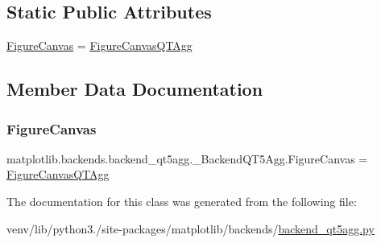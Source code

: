 \subsection*{Static Public Attributes}
\begin{DoxyCompactItemize}
\item 
\hyperlink{classmatplotlib_1_1backends_1_1backend__qt5agg_1_1__BackendQT5Agg_a93e43c911d26ee447b15d20c36ebd81d}{Figure\+Canvas} = \hyperlink{classmatplotlib_1_1backends_1_1backend__qt5agg_1_1FigureCanvasQTAgg}{Figure\+Canvas\+Q\+T\+Agg}
\end{DoxyCompactItemize}


\subsection{Member Data Documentation}
\mbox{\label{classmatplotlib_1_1backends_1_1backend__qt5agg_1_1__BackendQT5Agg_a93e43c911d26ee447b15d20c36ebd81d}} 
\subsubsection{\texorpdfstring{Figure\+Canvas}{FigureCanvas}}
{\footnotesize\ttfamily matplotlib.\+backends.\+backend\+\_\+qt5agg.\+\_\+\+Backend\+Q\+T5\+Agg.\+Figure\+Canvas = \hyperlink{classmatplotlib_1_1backends_1_1backend__qt5agg_1_1FigureCanvasQTAgg}{Figure\+Canvas\+Q\+T\+Agg}\hspace{0.3cm}{\ttfamily [static]}}



The documentation for this class was generated from the following file\+:\begin{DoxyCompactItemize}
\item 
venv/lib/python3./site-\/packages/matplotlib/backends/\hyperlink{backend__qt5agg_8py}{backend\+\_\+qt5agg.\+py}\end{DoxyCompactItemize}
